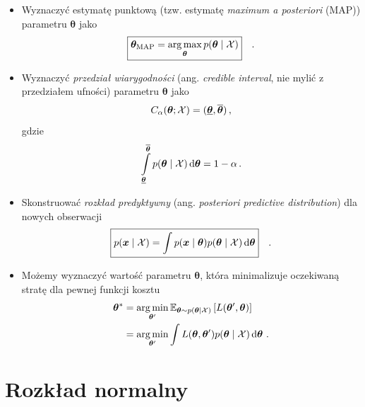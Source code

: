 \documentclass{myclass}
\begin{document}
\begin{itemize}
    \item Wyznaczyć estymatę punktową (tzw. estymatę \emph{maximum a posteriori} (MAP)) parametru
    \(\bm{\theta}\) jako
    \[
    \boxed{
        \bm{\theta}_\text{MAP} = \operatorname*{arg\,max}_{\bm{\theta}} p(\bm{\theta} \mid \mathcal{X})
    }\quad.
    \]

    \item Wyznaczyć \emph{przedział wiarygodności} (ang. \emph{credible interval}, nie mylić z
    przedziałem ufności) parametru \(\bm{\theta}\) jako
    \[
        C_\alpha (\bm{\theta}; \mathcal{X}) = (\underline{\bm{\theta}}, \overline{\bm{\theta}})\,,
    \]
    gdzie
    \[
        \int\limits_{\underline{\bm{\theta}}}^{\overline{\bm{\theta}}} p(\bm{\theta} \mid \mathcal{X}) \dd{\bm{\theta}} = 1 - \alpha\,.
    \]

    \item Skonstruować \emph{rozkład predyktywny} (ang. \emph{posteriori predictive distribution})
    dla nowych obserwacji
    \[
    \boxed{
        p(\bm{x} \mid \mathcal{X}) = \int p(\bm{x} \mid \bm{\theta}) p(\bm{\theta} \mid \mathcal{X}) \dd{\bm{\theta}}
    }\quad.
    \]

    \item Możemy wyznaczyć wartość parametru \(\bm{\theta}\), która minimalizuje oczekiwaną stratę
    dla pewnej funkcji kosztu
    \[\begin{split} \bm{\theta}^* &= \operatorname*{arg\,min}_{\bm{\theta}'} \mathbb{E}_{\bm{\theta} \sim
        p(\bm{\theta}\mid\mathcal{X})}\left[ L(\bm{\theta}', \bm{\theta}) \right] \\
                      &= \operatorname*{arg\,min}_{\bm{\theta}'} \int L(\bm{\theta}, \bm{\theta}') p(\bm{\theta} \mid
                      \mathcal{X}) \dd{\bm{\theta}}\,.
    \end{split}
    \]

\end{itemize}

\section{Rozkład normalny}
\end{document}
